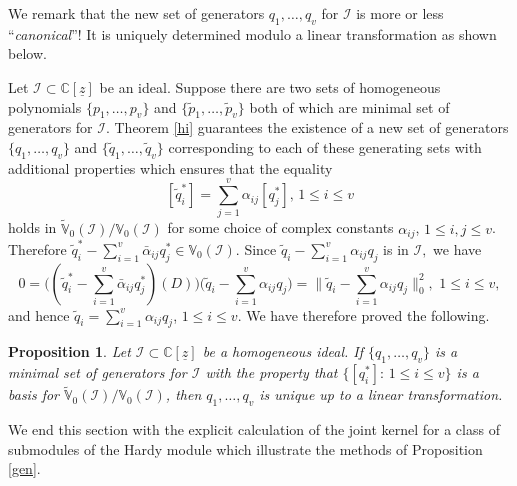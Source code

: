 \documentclass[11pt]{amsart}
\newtheorem{prop}[thm]{Proposition}
\theoremstyle{definition}
\numberwithin{equation}{section}
\begin{document}
We remark that the new set of generators $q_1, \ldots , q_v$ for $\mathcal I$ is more or less ``\emph {canonical}''! It is uniquely determined modulo a linear transformation as shown below.

Let $\mathcal I\subset{{\mathbb C}}[\underline{z}]$ be an ideal. Suppose there are two sets of homogeneous polynomials $\{p_1,\ldots,p_v\}$ and $\{\tilde p_1,\ldots,\tilde p_v\}$ both of which are minimal set of generators for $\mathcal I$.  Theorem \ref{hi} guarantees the existence of a new set of generators $\{q_1,\ldots,q_v\}$ and $\{\tilde q_1,\ldots,\tilde q_v\}$ corresponding to each of these generating sets with additional properties which ensures that the equality
$$
[\tilde q_i^*]= \sum_{j=1}^v\alpha_{ij}[q_j^*],\,1\leq i\leq v
$$
holds in $\tilde{\mathbb V}_0(\mathcal I)/\mathbb V_0(\mathcal I)$ for some choice of complex constants $\alpha_{ij}$, $1\leq i,j\leq v$. Therefore $\tilde q_i^* - \sum_{i=1}^v\bar\alpha_{ij}q_j^*\in {\mathbb V}_{0}(\mathcal I)$. Since $\tilde q_i - \sum_{i=1}^v\alpha_{ij}q_j$ is in $\mathcal I,$ we have
$$
0 = \big ( (\tilde q_i^* - \sum_{i=1}^v\bar\alpha_{ij}q_j^* )(D) \big )\big (\tilde q_i - \sum_{i=1}^v\alpha_{ij}q_j\big ) = \parallel \tilde q_i - \sum_{i=1}^v\alpha_{ij}q_j\parallel^2_0,\,\, 1\leq i\leq v,
$$ 
and hence $\tilde q_i= \sum_{i=1}^v\alpha_{ij}q_j$, $1\leq i\leq v$. We have therefore proved the following.
\begin{prop}\label{vn}
Let $\mathcal I\subset {{\mathbb C}}[\underline{z}]$ be a homogeneous ideal.  If $\{q_1, \ldots, q_v\}$ is a minimal set of generators for $\mathcal I$ with the property that $\{[q_i^*]:\,1\leq i \leq v\}$ is a basis for $\tilde{\mathbb V}_0(\mathcal I)/\mathbb V_0(\mathcal I)$,  then $q_1, \ldots, q_v$ is unique up to a linear transformation.
\end{prop}

We end this section with the explicit calculation of the joint kernel for a class of submodules of the Hardy module which illustrate the methods of Proposition \ref{gen}.
\end{document}
